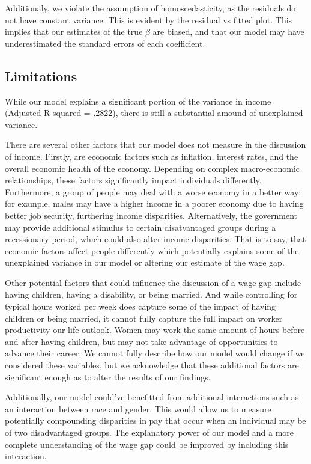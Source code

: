 \documentclass{article}
\begin{document}
Additionaly, we violate the assumption of homoscedasticity, as the residuals do not have constant variance. This is evident by the residual vs fitted plot.
This implies that our estimates of the true $\beta$ are biased, and that our model may have underestimated the standard errors of each coefficient.


\subsection*{Limitations}
While our model explains a significant portion of the variance in income (Adjusted R-squared = .2822), there is still a substantial amound of unexplained variance.

There are several other factors that our model does not measure in the discussion of income. Firstly, are economic factors such as inflation, interest rates, and the overall economic health of the economy. 
Depending on complex macro-economic relationships, these factors significantly impact individuals differently. Furthermore, a group of people may deal with a worse economy in 
a better way; for example, males may have a higher income in a poorer economy due to having better job security, furthering income disparities.
Alternatively, the government may provide additional stimulus to certain disatvantaged groups during a recessionary period, which could also alter income disparities.
That is to say, that economic factors affect people differently which potentially explains some of the unexplained variance in our model or altering our estimate of the wage gap.

Other potential factors that could influence the discussion of a wage gap include
having children, having a disability, or being married. And while controlling for typical hours worked per week does capture some of the impact of having children or being married, it cannot fully capture the
full impact on worker productivity our life outlook.
Women may work the same amount of hours before and after having children, but may not take advantage of opportunities to advance their career. We cannot fully describe how our model would change if we considered these variables,
but we acknowledge that these additional factors are significant enough as to alter the results of our findings.

Additionally, our model could've benefitted from additional interactions such as an interaction between race and gender. This would allow us to measure potentially compounding disparities in pay that occur
when an individual may be of two disadvantaged groups. The explanatory power of our model and a more complete understanding of the wage gap could be improved by including this interaction.
\end{document}
